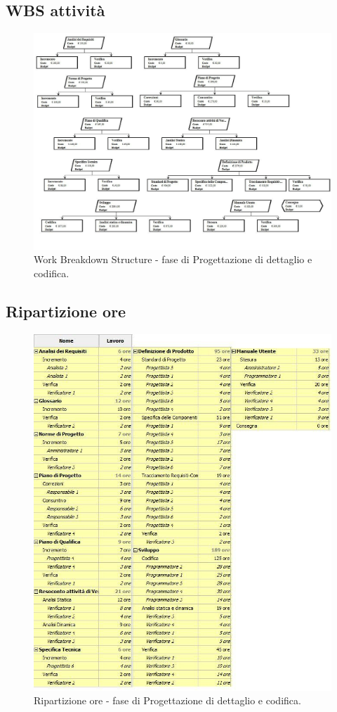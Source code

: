 \documentclass[a4paper]{report}
\begin{document}
			\subsection{WBS attività}
				\begin{figure}[H]
					\centering
					\includegraphics[scale=0.3]{WBSCodifica}
					\caption{Work Breakdown Structure - fase di Progettazione di dettaglio e codifica.}
				\end{figure}
			\subsection{Ripartizione ore}
				\begin{figure}[H]
					\centering
					\includegraphics[scale=0.6]{ROCodifica}
					\caption{Ripartizione ore - fase di Progettazione di dettaglio e codifica.}
				\end{figure}
\end{document}
